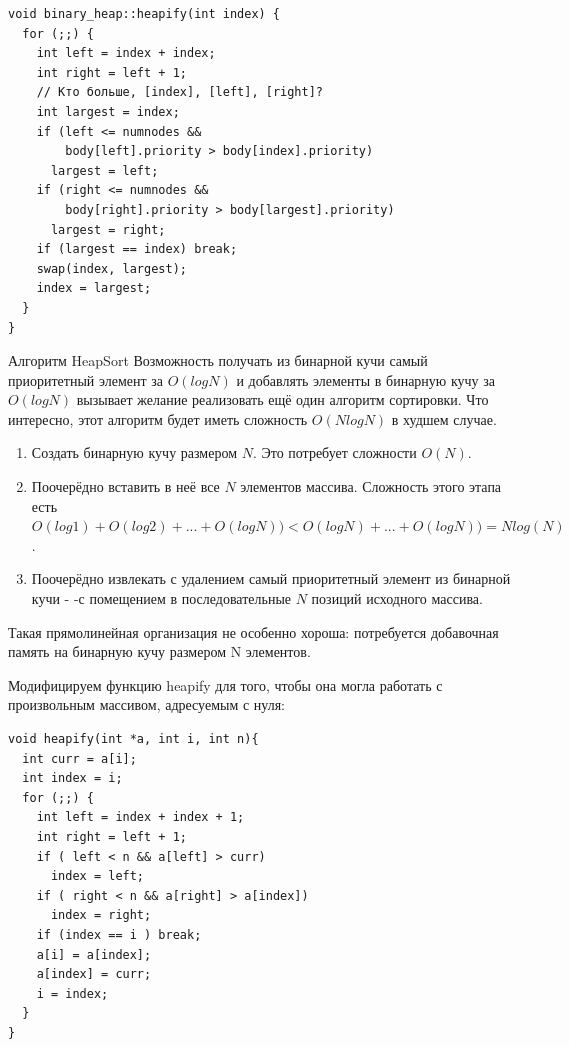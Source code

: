 \documentclass{beamer}
\begin{document}
\begin{frame}[fragile]
	\begin{verbatim}
void binary_heap::heapify(int index) {
  for (;;) {
    int left = index + index;
    int right = left + 1;
    // Кто больше, [index], [left], [right]?
    int largest = index;
    if (left <= numnodes &&
        body[left].priority > body[index].priority)
      largest = left;
    if (right <= numnodes &&
        body[right].priority > body[largest].priority)
      largest = right;
    if (largest == index) break;
    swap(index, largest);
    index = largest;
  }
}
	\end{verbatim}
\end{frame}

\begin{frame}{Алгоритм HeapSort}
	Возможность получать из бинарной кучи самый приоритетный элемент за $O(log N)$ и добавлять элементы в бинарную кучу за $O(log N)$ вызывает желание реализовать ещё один алгоритм сортировки. Что интересно, этот
алгоритм будет иметь сложность $O(N log N)$ в худшем случае.
	\begin{enumerate}
		\item Создать бинарную кучу размером $N$. Это потребует сложности $O(N)$.
		\item Поочерёдно вставить в неё все $N$ элементов массива. Сложность этого этапа есть
$O(log 1)+O(log 2)+...+O(log N))<O(log N)+...+O(log N))=N log(N)$.
		\item Поочерёдно извлекать с удалением самый приоритетный элемент из бинарной кучи - -с помещением в последовательные $N$ позиций исходного массива.
	\end{enumerate}
	Такая прямолинейная организация не особенно хороша: потребуется добавочная память на бинарную кучу размером N элементов.
\end{frame}

\begin{frame}[fragile]
	Модифицируем функцию heapify для того, чтобы она могла работать с произвольным массивом, адресуемым с нуля:
	\begin{verbatim}
void heapify(int *a, int i, int n){
  int curr = a[i];
  int index = i;
  for (;;) {
    int left = index + index + 1;
    int right = left + 1;
    if ( left < n && a[left] > curr)
      index = left;
    if ( right < n && a[right] > a[index])
      index = right;
    if (index == i ) break;
    a[i] = a[index];
    a[index] = curr;
    i = index;
  }
}
	\end{verbatim}
\end{frame}
\end{document}
